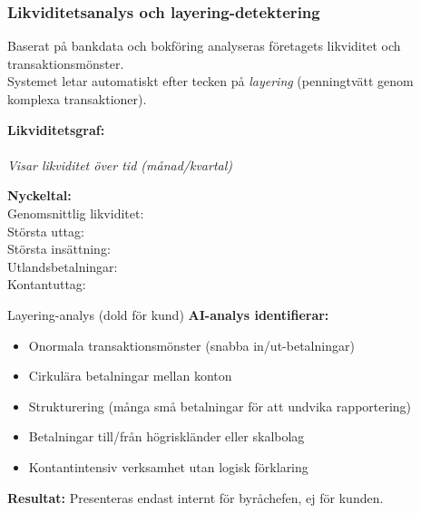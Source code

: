 \documentclass[10pt]{beamer}
\begin{document}
\begin{frame}[label=likviditetsgraf]
  \frametitle{Likviditetsanalys och layering-detektering}
  \small
  Baserat på bankdata och bokföring analyseras företagets likviditet och transaktionsmönster.\\
  Systemet letar automatiskt efter tecken på \textit{layering} (penningtvätt genom komplexa transaktioner).
  
  \vspace{0.4cm}
  \begin{minipage}{0.58\textwidth}
    \textbf{Likviditetsgraf:}\\
    \fbox{\rule{6cm}{3.5cm}}\\
    \footnotesize\textit{Visar likviditet över tid (månad/kvartal)}
  \end{minipage}
  \hfill
  \begin{minipage}{0.38\textwidth}
    \textbf{Nyckeltal:}\\
    \vspace{0.2cm}
    Genomsnittlig likviditet: \underline{\hspace{2cm}}\\
    Största uttag: \underline{\hspace{2cm}}\\
    Största insättning: \underline{\hspace{2cm}}\\
    Utlandsbetalningar: \underline{\hspace{2cm}}\\
    Kontantuttag: \underline{\hspace{2cm}}\\
  \end{minipage}
  
  \vspace{0.4cm}
  \begin{block}{Layering-analys (dold för kund)}
    \footnotesize
    \textbf{AI-analys identifierar:}
    \begin{itemize}
      \item Onormala transaktionsmönster (snabba in/ut-betalningar)
      \item Cirkulära betalningar mellan konton
      \item Strukturering (många små betalningar för att undvika rapportering)
      \item Betalningar till/från högriskländer eller skalbolag
      \item Kontantintensiv verksamhet utan logisk förklaring
    \end{itemize}
    \textbf{Resultat:} Presenteras endast internt för byråchefen, ej för kunden.
  \end{block}
  

\end{frame}
\end{document}
